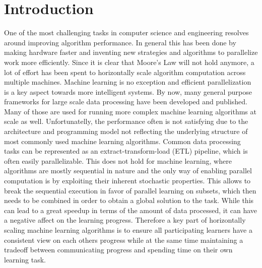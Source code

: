 \chapter{Introduction}
One of the most challenging tasks in computer science and engineering resolves around improving algorithm performance.
In general this has been done by making hardware faster and inventing new strategies and algorithms to parallelize work more efficiently.
Since it is clear that Moore's Law will not hold anymore, a lot of effort has been spent to horizontally scale algorithm computation across multiple machines.
Machine learning is no exception and efficient parallelization is a key aspect towards more intelligent systems.
By now, many general purpose frameworks for large scale data processing have been developed and published. Many of those are used for running more complex machine learning algorithms at scale as well.
Unfortunatelly, the performance often is not satisfying due to the architecture and programming model not reflecting the underlying structure of most commonly used machine learning algorithms.
Common data processing tasks can be represented as an extract-transform-load (ETL) pipeline, which is often easily parallelizable. This does not hold for machine learning, where algorithms are mostly sequential in nature and the only way of enabling parallel computation is by exploiting their inherent stochastic properties. This allows to break the sequential execution in favor of parallel learning on subsets, which then needs to be combined in order to obtain a global solution to the task.
While this can lead to a great speedup in terms of the amount of data processed, it can have a negative affect on the learning progress.
Therefore a key part of horizontally scaling machine learning algorithms is to ensure all participating learners have a consistent view on each others progress while at the same time maintaining a tradeoff between communicating progress and spending time on their own learning task.


